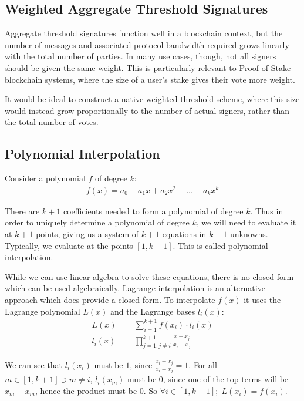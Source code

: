\documentclass{article}
\begin{document}
\subsection{
  Weighted Aggregate Threshold Signatures
}

Aggregate threshold signatures function well in a blockchain context, but the number of messages and associated protocol bandwidth required grows linearly with the total number of parties.  In many use cases, though, not all signers should be given the same weight.  This is particularly relevant to Proof of Stake blockchain systems, where the size of a user's stake gives their vote more weight.

It would be ideal to construct a native weighted threshold scheme, where this size would instead grow proportionally to the number of actual signers, rather than the total number of votes.  

\subsection{
  Polynomial Interpolation
}

Consider a polynomial $f$ of degree $k$:
\begin{align}
  f(x) = a_0 + a_1 x + a_2 x^2 + ... + a_k x^k\nonumber
\end{align}

There are $k+1$ coefficients needed to form a polynomial of degree $k$.  Thus in order to uniquely determine a polynomial of degree $k$, we will need to evaluate it at $k+1$ points, giving us a system of $k+1$ equations in $k+1$ unknowns.  Typically, we evaluate at the points $[1, k+1]$.  This is called polynomial interpolation.

While we can use linear algebra to solve these equations, there is no closed form which can be used algebraically.  Lagrange interpolation \cite{lagrange} is an alternative approach which does provide a closed form.  To interpolate $f(x)$ it uses the Lagrange polynomial $L(x)$ and the Lagrange bases $l_i(x)$:
\begin{align}
  L(x) &= \sum_{i=1}^{k+1} f(x_i) \cdot l_i(x)\\
  l_i(x) &= \prod_{j=1, j \neq i}^{k+1} \frac{x - x_j}{x_i - x_j}
\end{align}

We can see that $l_i(x_i)$ must be $1$, since $\frac{x_i - x_j}{x_i - x_j} = 1$.  For all $m \in [1, k+1] \ni m \neq i$, $l_i(x_m)$ must be $0$, since one of the top terms will be $x_m - x_m$, hence the product must be $0$.  So $\forall i \in [1,k+1];\; L(x_i) = f(x_i)$.
\end{document}
